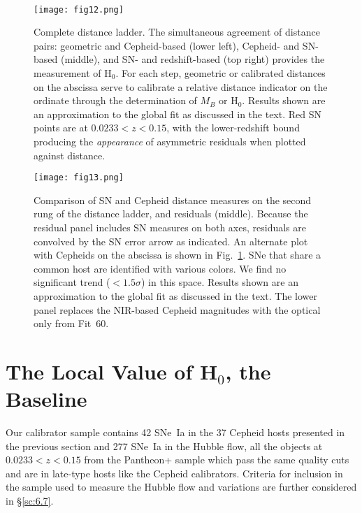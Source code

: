 \documentclass[12pt]{aastex631}
\begin{document}
\ \par
\begin{figure}[b]
\begin{center}
\texttt{[image: fig12.png]}
\end{center}
\caption{\label{fg:ladder} Complete distance ladder.  The simultaneous agreement of distance pairs: geometric and Cepheid-based (lower left), Cepheid- and SN-based (middle), and SN- and redshift-based (top right) provides the measurement of H$_0$.  For each step, geometric or calibrated distances on the abscissa serve to calibrate a relative distance indicator on the ordinate through the determination of $M_B$ or H$_0$.  Results shown are an approximation to the global fit as discussed in the text.  Red SN points are at $0.0233 < z < 0.15$, with the lower-redshift bound producing the {\it appearance} of asymmetric residuals when plotted against distance.}
\end{figure}

\clearpage

\begin{figure}[t]
\begin{center}
\texttt{[image: fig13.png]}
\end{center}
\caption{\label{fg:comp_ceph} Comparison of SN and Cepheid distance measures on the second rung of the distance ladder, and residuals (middle).  Because the residual panel includes SN measures on both axes, residuals are convolved by the SN error arrow as indicated.  An alternate plot with Cepheids on the abscissa is shown in Fig.~\ref{fg:ladder}.  SNe that share a common host are identified with various colors.  We find no significant trend ($<1.5\sigma$) in this space.  Results shown are an approximation to the global fit as discussed in the text.  The lower panel replaces the NIR-based Cepheid magnitudes with the optical only from Fit~60.}
\end{figure}

\clearpage

\section{The Local Value of H$_0$, the Baseline\label{sc:5}}

Our calibrator sample contains 42 SNe~Ia in the 37 Cepheid hosts presented in the previous section and 277 SNe~Ia in the Hubble flow, all the objects at $0.0233\!<\!z\!<\!0.15$ from the Pantheon+ sample which pass the same quality cuts and are in late-type hosts like the Cepheid calibrators. Criteria for inclusion in the sample used to measure the Hubble flow and variations are further considered in \S\ref{sc:6.7}.  
\end{document}
